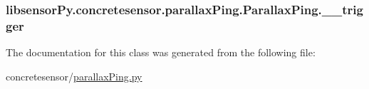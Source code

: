 \subsubsection[{\+\_\+\+\_\+trigger}]{\setlength{\rightskip}{0pt plus 5cm}libsensor\+Py.\+concretesensor.\+parallax\+Ping.\+Parallax\+Ping.\+\_\+\+\_\+trigger\hspace{0.3cm}{\ttfamily [private]}}\label{classlibsensorPy_1_1concretesensor_1_1parallaxPing_1_1ParallaxPing_a3e5d729761f044a7b0fde75695b03c90}


The documentation for this class was generated from the following file\+:\begin{DoxyCompactItemize}
\item 
concretesensor/\hyperlink{concretesensor_2parallaxPing_8py}{parallax\+Ping.\+py}\end{DoxyCompactItemize}
